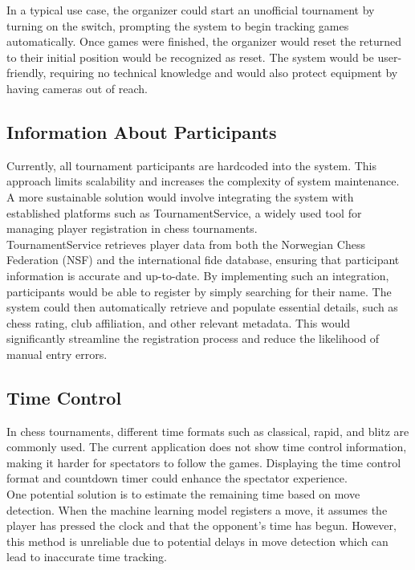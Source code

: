 In a typical use case, the organizer could start an unofficial tournament by turning on the switch, prompting the system to begin tracking games automatically. Once games were finished, the organizer would reset the returned to their initial position would be recognized as reset. The system would be user-friendly, requiring no technical knowledge and would also protect equipment by having cameras out of reach.

\subsection{Information About Participants}
Currently, all tournament participants are hardcoded into the system. This approach limits scalability and increases the complexity of system maintenance. A more sustainable solution would involve integrating the system with established platforms such as TournamentService, a widely used tool for managing player registration in chess tournaments. \\

TournamentService retrieves player data from both the Norwegian Chess Federation (NSF) and the international \gls{fide} database, ensuring that participant information is accurate and up-to-date.
By implementing such an integration, participants would be able to register by simply searching for their name. The system could then automatically retrieve and populate essential details, such as chess rating, club affiliation, and other relevant metadata. This would significantly streamline the registration process and reduce the likelihood of manual entry errors. \\


\subsection{Time Control}
In chess tournaments, different time formats such as \gls{classical}, \gls{rapid}, and \gls{blitz} are commonly used. The current application does not show time control information, making it harder for spectators to follow the games. Displaying the time control format and countdown timer could enhance the spectator experience. \\

One potential solution is to estimate the remaining time based on move detection. When the machine learning model registers a move, it assumes the player has pressed the clock and that the opponent’s time has begun. However, this method is unreliable due to potential delays in move detection which can lead to inaccurate time tracking. \\

